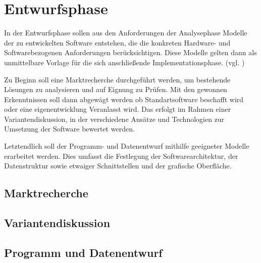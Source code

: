 \section{Entwurfsphase}
\label{sec:Entwurfsphase}
In der Entwurfsphase sollen aus den Anforderungen der Analysephase Modelle der zu entwickelten Software entstehen, die die konkreten Hardware- und Softwarebezogenen Anforderungen berücksichtigen. Diese Modelle gelten dann als unmittelbare Vorlage für die sich anschließende Implementationsphase. (vgl. \cite[S. 69]{dumke-2003})

Zu Beginn soll eine Marktrecherche durchgeführt werden, um bestehende Lösungen zu analysieren und auf Eignung zu Prüfen. Mit den gewonnen Erkenntnissen soll dann abgewägt werden ob Standartsoftware beschafft wird oder eine eigenentwicklung Veranlasst wird. Das erfolgt im Rahmen einer Variantendiskussion, in der verschiedene Ansätze und Technologien zur Umsetzung der Software bewertet werden.

Letztendlich soll der Programm- und Datenentwurf mithilfe geeigneter Modelle erarbeitet werden. Dies umfasst die Festlegung der Softwarearchitektur, der Datenstruktur sowie etwaiger Schnittstellen und der grafische Oberfläche.

\subsection{Marktrecherche}
\label{sec:Marktrecherche}

\subsection{Variantendiskussion}
\label{sec:Marktrecherche}

\subsection{Programm und Datenentwurf}
\label{sec:ProgrammUDatenentwurf}